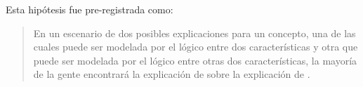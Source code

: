 \begin{hyp}
Esta hipótesis fue pre-registrada como:
\begin{quote}
En un escenario de dos posibles explicaciones para un concepto, una de las cuales puede ser modelada por el \AND lógico entre dos características y otra que puede ser modelada por el \OR lógico entre otras dos características, la mayoría de la gente encontrará la explicación de \AND sobre la explicación de \OR.
\end{quote}
\end{hyp}

